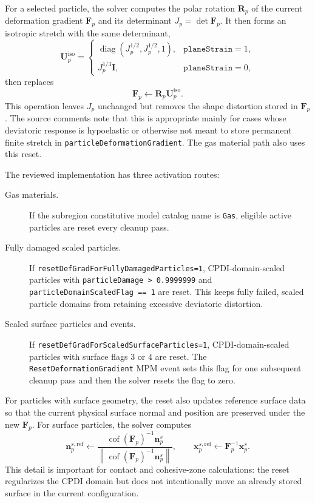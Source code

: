For a selected particle, the solver computes the polar rotation $\mathbf{R}_p$ of the current deformation gradient $\mathbf{F}_p$ and its determinant $J_p=\det \mathbf{F}_p$.  It then forms an isotropic stretch with the same determinant,
\begin{equation}
  \mathbf{U}^{\mathrm{iso}}_p =
  \begin{cases}
    \operatorname{diag}(J_p^{1/2},J_p^{1/2},1), & \texttt{planeStrain}=1,\\[3pt]
    J_p^{1/3}\mathbf{I}, & \texttt{planeStrain}=0,
  \end{cases}
\end{equation}
then replaces
\begin{equation}
  \mathbf{F}_p \leftarrow \mathbf{R}_p\mathbf{U}^{\mathrm{iso}}_p.
  \label{eq:robust-defgrad-reset}
\end{equation}
This operation leaves $J_p$ unchanged but removes the shape distortion stored in $\mathbf{F}_p$.  The source comments note that this is appropriate mainly for cases whose deviatoric response is hypoelastic or otherwise not meant to store permanent finite stretch in \texttt{particleDeformationGradient}.  The gas material path also uses this reset.

The reviewed implementation has three activation routes:
\begin{description}
  \item[Gas materials.]  If the subregion constitutive model catalog name is \texttt{Gas}, eligible active particles are reset every cleanup pass.
  \item[Fully damaged scaled particles.]  If \texttt{resetDefGradForFullyDamagedParticles=1}, CPDI-domain-scaled particles with \texttt{particleDamage > 0.9999999} and \texttt{particleDomainScaledFlag == 1} are reset.  This keeps fully failed, scaled particle domains from retaining excessive deviatoric distortion.
  \item[Scaled surface particles and events.]  If \texttt{resetDefGradForScaledSurfaceParticles=1}, CPDI-domain-scaled particles with surface flags 3 or 4 are reset.  The \texttt{ResetDeformationGradient} MPM event sets this flag for one subsequent cleanup pass and then the solver resets the flag to zero.
\end{description}

For particles with surface geometry, the reset also updates reference surface data so that the current physical surface normal and position are preserved under the new $\mathbf{F}_p$.  For surface particles, the solver computes
\begin{equation}
  \mathbf{n}^{s,\mathrm{ref}}_p \leftarrow
  \frac{\operatorname{cof}(\mathbf{F}_p)^{-1}\mathbf{n}^s_p}
       {\left\|\operatorname{cof}(\mathbf{F}_p)^{-1}\mathbf{n}^s_p\right\|},
  \qquad
  \mathbf{x}^{s,\mathrm{ref}}_p \leftarrow \mathbf{F}_p^{-1}\mathbf{x}^s_p.
\end{equation}
This detail is important for contact and cohesive-zone calculations: the reset regularizes the CPDI domain but does not intentionally move an already stored surface in the current configuration.

